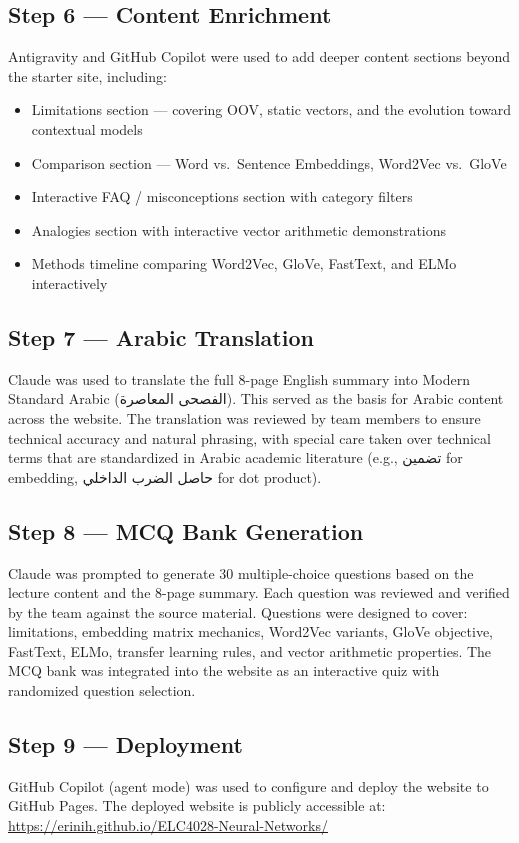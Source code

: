 \subsection{Step 6 — Content Enrichment}
Antigravity and GitHub Copilot were used to add deeper content sections beyond the starter site, including:
\begin{itemize}
    \item Limitations section — covering OOV, static vectors, and the evolution toward contextual models
    \item Comparison section — Word vs.\ Sentence Embeddings, Word2Vec vs.\ GloVe
    \item Interactive FAQ / misconceptions section with category filters
    \item Analogies section with interactive vector arithmetic demonstrations
    \item Methods timeline comparing Word2Vec, GloVe, FastText, and ELMo interactively
\end{itemize}

\subsection{Step 7 — Arabic Translation}
Claude was used to translate the full 8-page English summary into Modern Standard Arabic (\textarabic{الفصحى المعاصرة}). This served as the basis for Arabic content across the website. The translation was reviewed by team members to ensure technical accuracy and natural phrasing, with special care taken over technical terms that are standardized in Arabic academic literature (e.g., \textarabic{تضمين} for embedding, \textarabic{حاصل الضرب الداخلي} for dot product).

\subsection{Step 8 — MCQ Bank Generation}
Claude was prompted to generate 30 multiple-choice questions based on the lecture content and the 8-page summary. Each question was reviewed and verified by the team against the source material. Questions were designed to cover: limitations, embedding matrix mechanics, Word2Vec variants, GloVe objective, FastText, ELMo, transfer learning rules, and vector arithmetic properties. The MCQ bank was integrated into the website as an interactive quiz with randomized question selection.

\subsection{Step 9 — Deployment}
GitHub Copilot (agent mode) was used to configure and deploy the website to GitHub Pages. The deployed website is publicly accessible at: \url{https://erinih.github.io/ELC4028-Neural-Networks/}

